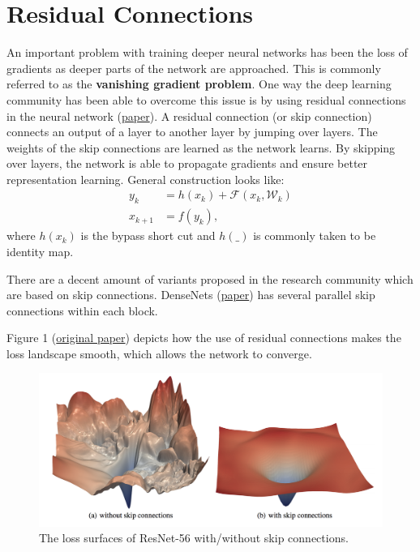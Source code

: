 \section{Residual Connections}
An important problem with training deeper neural networks has been the loss of gradients as deeper parts of the network are approached.
This is commonly referred to as the \textbf{vanishing gradient problem}.
One way the deep learning community has been able to overcome this issue is by using residual connections in the neural network (\href{https://arxiv.org/abs/1512.03385}{paper}).
A residual connection (or skip connection) connects an output of a layer to another layer by jumping over layers.
The weights of the skip connections are learned as the network learns.
By skipping over layers, the network is able to propagate gradients and ensure better representation learning.
General construction looks like:
$$
\begin{aligned}
y_k & = h(x_k) +\mathcal{F}(x_k, \mathcal{W}_k)\\
x_{k+1} & = f(y_k),
\end{aligned}
$$
where $h(x_k)$ is the bypass short cut and $h(\_)$ is commonly taken to be identity map.

There are a decent amount of variants proposed in the research community which are based on skip connections.
DenseNets (\href{https://arxiv.org/abs/1608.06993}{paper}) has several parallel skip connections within each block.

Figure 1 (\href{https://arxiv.org/pdf/1712.09913.pdf}{original paper}) depicts how the use of residual connections makes the loss landscape smooth, which allows the network to converge.

\begin{figure}
    \centering
    \includegraphics[width=\textwidth]{labs/05/images/loss.png}
    \caption{ The loss surfaces of ResNet-56 with/without skip connections.}
    \label{fig:my_label0}
\end{figure}

